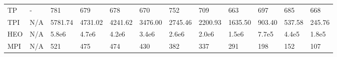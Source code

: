 \begin{table*}
{\begin{tabular}{llllllllllll}
TP       &              - &                781 &                679 &                678 &                670 &                752 &                709 &                663 &               697 &                685 &                668 \\
TPI      &            N/A &            5781.74 &            4731.02 &            4241.62 &            3476.00 &            2745.46 &            2200.93 &            1635.50 &            903.40 &             537.58 &             245.76 \\
HEO      &            N/A &              5.8e6 &              4.7e6 &              4.2e6 &              3.4e6 &              2.6e6 &              2.0e6 &              1.5e6 &             7.7e5 &              4.4e5 &              1.8e5 \\
MPI      &            N/A &                521 &                475 &                474 &                430 &                382 &                337 &                291 &               198 &                152 &                107 \\
\bottomrule
\end{tabular}}
\end{table*}
